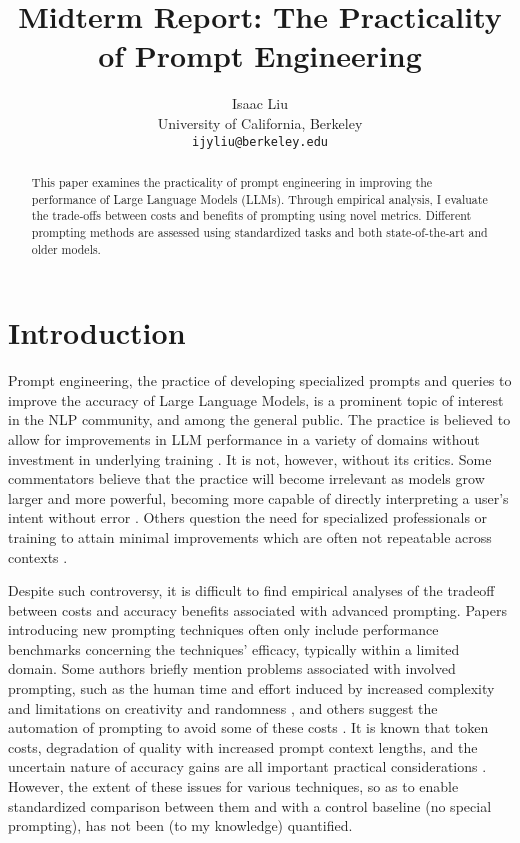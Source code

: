 \documentclass[11pt]{article}
\title{Midterm Report: The Practicality of Prompt Engineering}
\author{Isaac Liu \\
  University of California, Berkeley \\
  \texttt{ijyliu@berkeley.edu}}
\begin{document}
\maketitle
\begin{abstract}
  This paper examines the practicality of prompt engineering in improving the performance of Large Language Models (LLMs). Through empirical analysis, I evaluate the trade-offs between costs and benefits of prompting using novel metrics. Different prompting methods are assessed using standardized tasks and both state-of-the-art and older models.
\end{abstract}

\section*{Introduction}

Prompt engineering, the practice of developing specialized prompts and queries to improve the accuracy of Large Language Models, is a prominent topic of interest in the NLP community, and among the general public. The practice is believed to allow for improvements in LLM performance in a variety of domains without investment in underlying training \cite{martineau_what_2021}. It is not, however, without its critics. Some commentators believe that the practice will become irrelevant as models grow larger and more powerful, becoming more capable of directly interpreting a user's intent without error \cite{ethan_mollick_emollick_i_2023}. Others question the need for specialized professionals or training to attain minimal improvements which are often not repeatable across contexts \cite{shackell_prompt_2023, acar_ai_2023}. 

Despite such controversy, it is difficult to find empirical analyses of the tradeoff between costs and accuracy benefits associated with advanced prompting. Papers introducing new prompting techniques often only include performance benchmarks concerning the techniques' efficacy, typically within a limited domain. Some authors briefly mention problems associated with involved prompting, such as the human time and effort induced by increased complexity and limitations on creativity and randomness \cite{wu_ai_2022}, and others suggest the automation of prompting to avoid some of these costs \cite{diao_active_2023}. It is known that token costs, degradation of quality with increased prompt context lengths, and the uncertain nature of accuracy gains are all important practical considerations \cite{gao_prompt_2023}. However, the extent of these issues for various techniques, so as to enable standardized comparison between them and with a control baseline (no special prompting), has not been (to my knowledge) quantified.
\end{document}
